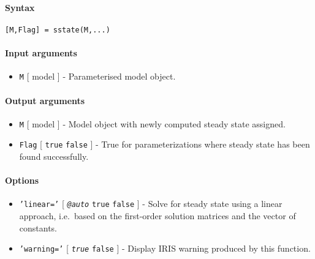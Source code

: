 


	\paragraph{Syntax}

\begin{verbatim}
[M,Flag] = sstate(M,...)
\end{verbatim}

\paragraph{Input arguments}

\begin{itemize}
\itemsep1pt\parskip0pt
\item
  \texttt{M} {[} model {]} - Parameterised model object.
\end{itemize}

\paragraph{Output arguments}

\begin{itemize}
\item
  \texttt{M} {[} model {]} - Model object with newly computed steady
  state assigned.
\item
  \texttt{Flag} {[} \texttt{true} \textbar{} \texttt{false} {]} - True
  for parameterizations where steady state has been found successfully.
\end{itemize}

\paragraph{Options}

\begin{itemize}
\item
  \texttt{'linear='} {[} \emph{\texttt{@auto}} \textbar{} \texttt{true}
  \textbar{} \texttt{false} {]} - Solve for steady state using a linear
  approach, i.e.~based on the first-order solution matrices and the
  vector of constants.
\item
  \texttt{'warning='} {[} \emph{\texttt{true}} \textbar{} \texttt{false}
  {]} - Display IRIS warning produced by this function.
\end{itemize}

